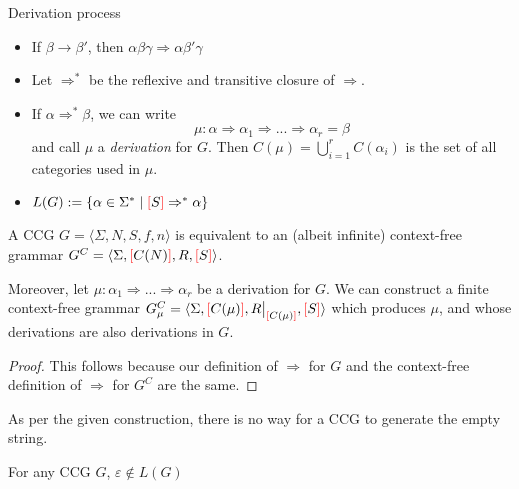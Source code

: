 \documentclass[main.tex]{subfiles}
\begin{document}
\begin{defn}
    Derivation process
    \begin{itemize}
        \item If $\beta \rightarrow \beta'$, then $\alpha \beta \gamma \Rightarrow \alpha \beta' \gamma$
        \item Let $\Rightarrow^*$ be the reflexive and transitive closure of $\Rightarrow$.
        \item If $\alpha \Rightarrow^* \beta$, we can write
            \[ \mu: \alpha \Rightarrow \alpha_1 \Rightarrow ... \Rightarrow \alpha_r = \beta \]
            and call $\mu$ a \emph{derivation} for $G$. Then $C(\mu) = \bigcup\limits_{i=1}^{r} C(\alpha_i)$
            is the set of all categories used in $\mu$.
        \item $L(G) := \{ \alpha \in \Sigma^* \mid \textcolor{red}{[} S \textcolor{red}{]} \Rightarrow^* \alpha \}$
    \end{itemize}
\end{defn}

\begin{prop}\label{prop:cfg}
    A CCG $G = \langle \Sigma, N, S, f, n \rangle$ is equivalent to an
    (albeit infinite) context-free grammar
    $G^C = \langle \Sigma, \textcolor{red}{[} C(N) \textcolor{red}{]}, R, \textcolor{red}{[} S \textcolor{red}{]} \rangle$.

    Moreover, let $\mu: \alpha_1 \Rightarrow ... \Rightarrow \alpha_r$
    be a derivation for $G$.
    We can construct a finite context-free grammar
    $G_\mu^C = \langle \Sigma, \lb C(\mu) \rb, \restr{R}{\lb C(\mu) \rb}, \lb S \rb \rangle$
    which produces $\mu$, and whose derivations are also derivations in $G$.
\end{prop}
\begin{proof}
    This follows because our definition of $\Rightarrow$ for $G$ and the context-free
    definition of $\Rightarrow$ for $G^C$ are the same.
\end{proof}

As per the given construction, there is no way for a CCG to generate the empty
string.
\begin{property}
    For any CCG $G$, $\varepsilon \notin L(G)$
\end{property}
\end{document}
